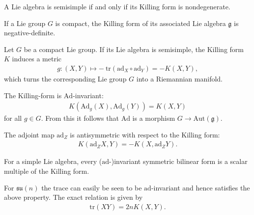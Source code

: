     \begin{theorem}
        A Lie algebra is semisimple if and only if its Killing form is nondegenerate.
    \end{theorem}

    \begin{property}
        If a Lie group $G$ is compact, the Killing form of its associated Lie algebra $\mathfrak{g}$ is negative-definite.
    \end{property}
    \begin{result}
        Let $G$ be a compact Lie group. If its Lie algebra is semisimple, the Killing form $K$ induces a metric
        \begin{gather}
            g:(X,Y)\mapsto -\ \text{tr}(\text{ad}_X\circ\text{ad}_Y) = -K(X,Y),
        \end{gather}
        which turns the corresponding Lie group $G$ into a Riemannian manifold.
    \end{result}

    \begin{property}
        The Killing-form is $\text{Ad}$-invariant:
        \begin{gather}
            K(\text{Ad}_g(X),\text{Ad}_g(Y)) = K(X,Y)
        \end{gather}
        for all $g\in G$. From this it follows that $\text{Ad}$ is a morphism $G\rightarrow\text{Aut}(\mathfrak{g})$.
    \end{property}
    \begin{result}
        The adjoint map $\text{ad}_Z$ is antisymmetric with respect to the Killing form:
        \begin{gather}
            \label{lie:ad_killing_form}
            K(\text{ad}_ZX,Y) = -K(X,\text{ad}_ZY).
        \end{gather}
    \end{result}

    \begin{property}\label{lie:killing_trace}
        For a simple Lie algebra, every ($\text{ad}$-)invariant symmetric bilinear form is a scalar multiple of the Killing form.
    \end{property}
    \begin{example}
        For $\mathfrak{su}(n)$ the trace can easily be seen to be $\text{ad}$-invariant and hence satisfies the above property. The exact relation is given by
        \begin{gather}
            \text{tr}(XY) = 2nK(X,Y).
        \end{gather}
    \end{example}

